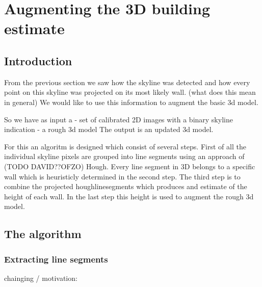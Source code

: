 
\section{Augmenting the 3D building estimate}
\subsection{Introduction}
From the previous section we saw how the skyline was detected and how every point on this skyline was projected on its most likely wall. (what does this mean in general)
We would like to use this information to augment the basic 3d model.

So we have as input a
- set of calibrated 2D images with a binary skyline indication
- a rough 3d model
The output is an updated 3d model.

For this an algoritm is designed which consist of several steps. 
First of all the individual skyline pixels are grouped into line segments using an approach of (TODO DAVID??OFZO) Hough.
Every line segment in 3D belongs to a specific wall which is heuristicly determined in the second step.
The third step is to combine the projected houghlinesegments which produces and estimate of the height of each wall.
In the last step this height is used to augment the rough 3d model.



 
\subsection{The algorithm}
\subsubsection{Extracting line segments} %
	chainging / motivation:




